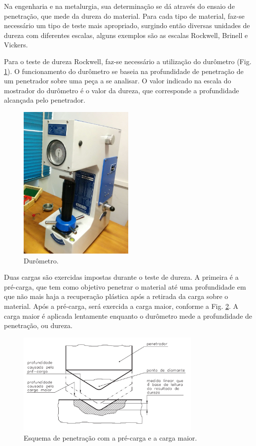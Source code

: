 \documentclass[
12pt,
openany, %
oneside, %
a4paper,			
english,			
brazil			        %
]{abntbibufjf}
\begin{document}
	Na engenharia e na metalurgia, sua determinação se dá através do ensaio de penetração, que mede da dureza do material. Para cada tipo de material, faz-se necessário um tipo de teste mais apropriado, surgindo então diversas unidades de dureza com diferentes escalas, alguns exemplos são as escalas Rockwell, Brinell e Vickers.

	Para o teste de dureza Rockwell, faz-se necessário a utilização do durômetro (Fig. \ref{fig:durometro}). O funcionamento do durômetro se baseia na profundidade de penetração de um penetrador sobre uma peça a se analisar. O valor indicado na escala do mostrador do durômetro é o valor da dureza, que corresponde a profundidade alcançada pelo penetrador.
	

	\begin{figure}[H]
		\centering
		\includegraphics[width=0.5\textwidth]{durometro}
		\caption{Durômetro.}
		\label{fig:durometro}
	\end{figure}

	Duas cargas são exercidas impostas durante o teste de dureza. A primeira é a pré-carga, que tem como objetivo penetrar o material até uma profundidade em que não mais haja a recuperação plástica após a retirada da carga sobre o material. Após a pré-carga, será exercida a carga maior, conforme a Fig. \ref{fig:dureza_rockwell}. A carga maior é aplicada lentamente enquanto o durômetro mede a profundidade de penetração, ou dureza.

	\begin{figure}[H]
		\centering
		\includegraphics[width=0.8\textwidth]{dureza_rockwell}
		\caption{Esquema de penetração com a pré-carga e a carga maior. \cite{esselrockwell}}
		\label{fig:dureza_rockwell}
	\end{figure}
\end{document}
